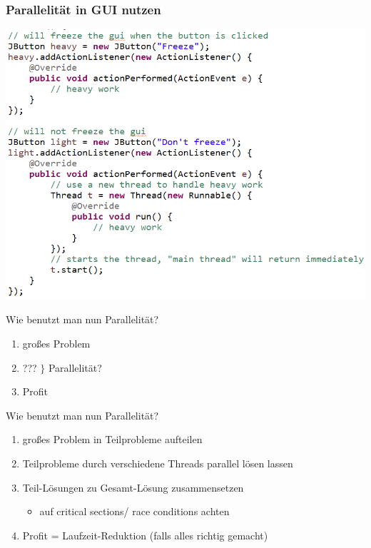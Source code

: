 \documentclass[18pt]{beamer}
\begin{document}
	\begin{frame}
		\frametitle{Parallelität in GUI nutzen}
		\centering
		\includegraphics[scale=0.4]{./pics/tut5/extra-thread.png}
	\end{frame}

	\begin{frame}{Wie benutzt man nun Parallelität?}
		\begin{enumerate}
			\item großes Problem
			\item ??? $\rbrace$ Parallelität?
			\item Profit
		\end{enumerate}
	\end{frame}

	\begin{frame}{Wie benutzt man nun Parallelität?}
		\begin{enumerate}
			\item großes Problem in Teilprobleme aufteilen
			\item Teilprobleme durch verschiedene Threads parallel lösen lassen
			\item Teil-Lösungen zu Gesamt-Lösung zusammensetzen
			\begin{itemize}
				\item auf critical sections/ race conditions achten
			\end{itemize}
			\item Profit = Laufzeit-Reduktion (falls alles richtig gemacht)
		\end{enumerate}
	\end{frame}
\end{document}
